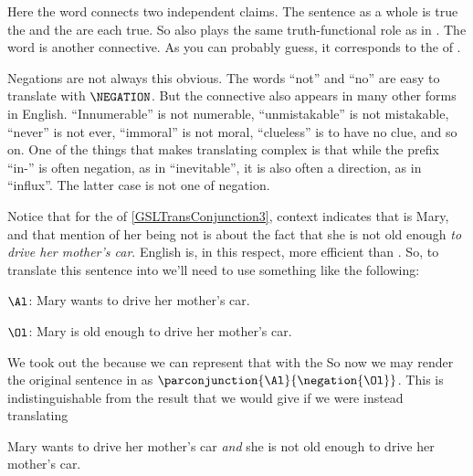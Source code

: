 \noindent{}Here the word  connects two independent claims.  The sentence as a whole is true \Iff the  and the  are each true.  So  also plays the same truth-functional role as \mention{$\WEDGE$} in \GSL{}. The word  is another connective.  As you can probably guess, it corresponds to the \mention{$\NEGATION$} of \GSL{}. 

Negations are not always this obvious. The words ``not'' and ``no'' are easy to translate with $\NEGATION$. 
But the connective also appears in many other forms in English. ``Innumerable'' is not numerable, ``unmistakable'' is not mistakable, ``never'' is not ever, ``immoral'' is not moral, ``clueless'' is to have no clue, and so on. 
One of the things that makes translating complex is that while the prefix ``in-'' is often negation, as in ``inevitable'', it is also often a direction, as in ``influx''. The latter case is not one of negation.

Notice that for the  of \ref{GSLTransConjunction3}, context indicates that  is Mary, and that mention of her being not  is about the fact that she is not old enough \emph{to drive her mother's car}. English is, in this respect, more efficient than \GSL{}. So, to translate this sentence into \GSL{} we'll need to use something like the following:

	\begin{description}[itemsep=0em]
		\item[Translation Key:] \hfill{} 
		\begin{description}[itemsep=0em]
			\item $\Al$: Mary wants to drive her mother's car.
			\item $\Ol$: Mary is old enough to drive her mother's car.
		\end{description} 
	\end{description}

\noindent{}We took out the  because we can represent that with the \mention{$\NEGATION$} So now we may render the original sentence in \GSL{} as $\parconjunction{\Al}{\negation{\Ol}}$.  This is indistinguishable from the result that we would give if we were instead translating

\begin{menumerate}
	\item Mary wants to drive her mother's car \emph{and} she is not old enough to drive her mother's car.
\end{menumerate}

